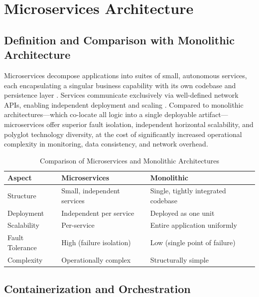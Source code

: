 \section{Microservices Architecture}
\label{sec:bg_microservices}

\subsection{Definition and Comparison with Monolithic Architecture}
\label{subsec:bg_ms_definition}

Microservices decompose applications into suites of small, autonomous services, each
encapsulating a singular business capability with its own codebase and persistence
layer \cite{newman2015building}. Services communicate exclusively via well-defined
network APIs, enabling independent deployment and scaling \cite{dragoni2017microservices}.
Compared to monolithic architectures---which co-locate all logic into a single
deployable artifact---microservices offer superior fault isolation, independent
horizontal scalability, and polyglot technology diversity, at the cost of significantly
increased operational complexity in monitoring, data consistency, and network overhead.

\begin{table}[H]
    \centering
    \begin{tabular}{|p{}|p{}|p{}|}
        \hline
        \textbf{Aspect} & \textbf{Microservices} & \textbf{Monolithic} \\
        \hline
        Structure & Small, independent services & Single, tightly integrated codebase \\
        \hline
        Deployment & Independent per service & Deployed as one unit \\
        \hline
        Scalability & Per-service & Entire application uniformly \\
        \hline
        Fault Tolerance & High (failure isolation) & Low (single point of failure) \\
        \hline
        Complexity & Operationally complex & Structurally simple \\
        \hline
    \end{tabular}
    \caption{Comparison of Microservices and Monolithic Architectures}
    \label{tab:ms_vs_monolith}
\end{table}

\subsection{Containerization and Orchestration}
\label{subsec:bg_ms_deployment}

